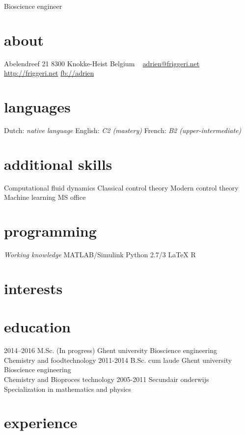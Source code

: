 \documentclass[]{friggeri-cv}
\begin{document}
       {Bioscience engineer}
\begin{aside}
  \section{about}
    Abelendreef 21
    8300 Knokke-Heist
    Belgium
    ~
    \href{mailto:bram.de.jaegher@gmail.com}{adrien@friggeri.net}
    \href{Moet nog weg}{http://friggeri.net}
    \href{Moet nog weg}{fb://adrien}
  \section{languages}
    Dutch: \textit{native language}
    English: \textit{C2 (mastery)}
    French:  \textit{B2  (upper-intermediate)}
  \section{additional skills}
  Computational fluid dynamics
  Classical control theory 
  Modern control theory 
  Machine learning
  MS office
  \section{programming}
  \textit{Working knowledge}
  MATLAB/Simulink
  Python 2.7/3
  LaTeX
  R 
\end{aside}
\section{interests}
\section{education}
\begin{entrylist}
    \entry
    {2014–2016}
    {M.Sc. (In progress)}
    {Ghent university}
    {Bioscience engineering\\
    Chemistry and foodtechnology}
  \entry
    {2011-2014}
    {B.Sc. cum laude}
    {Ghent university}
    {Bioscience engineering\\
    Chemistry and Bioproces technology}
  \entry
    {2005-2011}
    {Secundair onderwijs}
    {}
    {Specialization in mathematics and physics}
   
\end{entrylist}

\section{experience}
\end{document}
